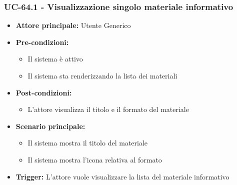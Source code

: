 \documentclass[a4paper,12pt]{article}
\begin{document}
\subsubsection{UC-64.1 - Visualizzazione singolo materiale informativo} \label{subsec:UC-64.1}
\begin{itemize}
    \item \textbf{Attore principale:} Utente Generico
    \item \textbf{Pre-condizioni:} 
    \begin{itemize}
        \item Il sistema è attivo
        \item Il sistema sta renderizzando la lista dei materiali
    \end{itemize}
    \item \textbf{Post-condizioni:}
    \begin{itemize}
        \item L'attore visualizza il titolo e il formato del materiale
    \end{itemize}
    \item \textbf{Scenario principale:} 
    \begin{itemize}
        \item Il sistema mostra il titolo del materiale
        \item Il sistema mostra l'icona relativa al formato
    \end{itemize}
    \item \textbf{Trigger:} L'attore vuole visualizzare la lista del materiale informativo
\end{itemize}
\end{document}
